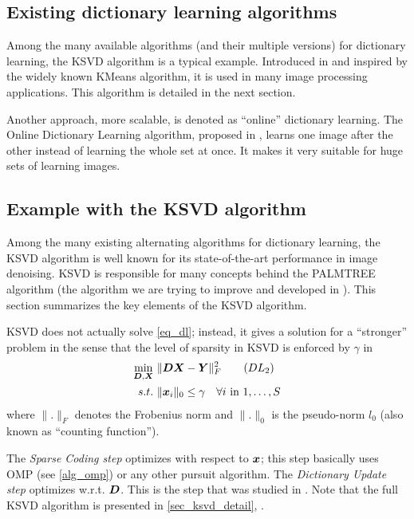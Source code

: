 \subsection{Existing dictionary learning algorithms}
Among the many available algorithms (and their multiple versions) for dictionary learning, the \ac{KSVD} algorithm is a typical example. Introduced in \cite{aharon_k-svd:_2006} and inspired by the widely known \gls{KMeans} algorithm, it is used in many image processing applications. This algorithm is detailed in the next section.

Another approach, more scalable, is denoted as “online” dictionary learning. The Online Dictionary Learning algorithm, proposed in \cite{mairal_online_2010}, learns one image after the other instead of learning the whole set at once. It makes it very suitable for huge sets of learning images.

\subsection{Example with the \acs{KSVD} algorithm}

Among the many existing alternating algorithms for dictionary learning, the \ac{KSVD} algorithm is well known for its state-of-the-art performance in image denoising. \ac{KSVD} is responsible for many concepts behind the \acs{PALMTREE} algorithm (the algorithm we are trying to improve and developed in \cite{chabiron_optimization_2016}). This section summarizes the key elements of the \ac{KSVD} algorithm.

\ac{KSVD} does not actually solve \eqref{eq_dl}; instead, it gives a solution for a “stronger” problem in the sense that the level of sparsity in \ac{KSVD} is enforced by $\gamma$ in
\begin{align*}
\underset{\bm{D},\bm{X}}{\min}~ & \lVert \bm{D}\bm{X}-\bm{Y} \rVert^2_F \tag{$DL_2$}\label{eq_dl_ksvd} \\
s.t.~& \lVert \bm{x}_i \rVert_0 \le \gamma \quad \forall i \text{ in } 1,\dots,S
\end{align*}
where $\lVert . \rVert_F$ denotes the Frobenius norm and $\lVert . \rVert_0$ is the pseudo-norm $l_0$ (also known as “counting function”).

The \emph{Sparse Coding step} optimizes with respect to $\bm{x}$; this step basically uses \ac{OMP} (see \cref{alg_omp}) or any other pursuit algorithm. The \emph{Dictionary Update step} optimizes w.r.t. $\bm{D}$. This is the step that was studied in \cite{chabiron_optimization_2016}. Note that the full \ac{KSVD} algorithm is presented in \cref{sec_ksvd_detail}, .

